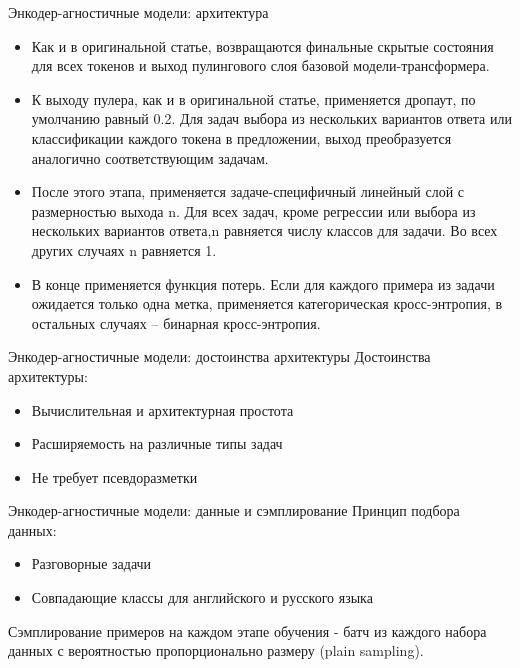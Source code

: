 \begin{frame}{Энкодер-агностичные модели: архитектура}
\begin{itemize}

  \item Как и в оригинальной статье, возвращаются финальные скрытые состояния для всех токенов и выход пулингового слоя базовой модели-трансформера. 
  
  \item К выходу пулера, как и в оригинальной статье, применяется дропаут, по умолчанию равный 0.2. Для задач выбора из нескольких вариантов ответа или классификации каждого токена в предложении, выход преобразуется аналогично соответствующим задачам.

  \item После этого этапа, применяется задаче-специфичный линейный слой с размерностью выхода {n}. Для всех задач, кроме регрессии или выбора из нескольких вариантов ответа,{n} равняется числу классов для задачи. Во всех других случаях {n} равняется 1.
 
  \item В конце применяется функция потерь. Если для каждого примера из задачи ожидается только одна метка, применяется категорическая кросс-энтропия, в остальных случаях -- бинарная кросс-энтропия. 
\end{itemize}
\end{frame}

\begin{frame}{Энкодер-агностичные модели: достоинства архитектуры}
Достоинства архитектуры:
\begin{itemize}
  \item Вычислительная и архитектурная простота
  \item Расширяемость на различные типы задач
  \item Не требует псевдоразметки
\end{itemize}
\end{frame}

\begin{frame}{Энкодер-агностичные модели: данные и сэмплирование}
Принцип подбора данных:
\begin{itemize}
    \item Разговорные задачи
    \item Совпадающие классы для английского и русского языка
\end{itemize}
Сэмплирование примеров на каждом этапе обучения - батч из каждого набора данных с вероятностью пропорционально размеру (plain sampling).
\end{frame}

